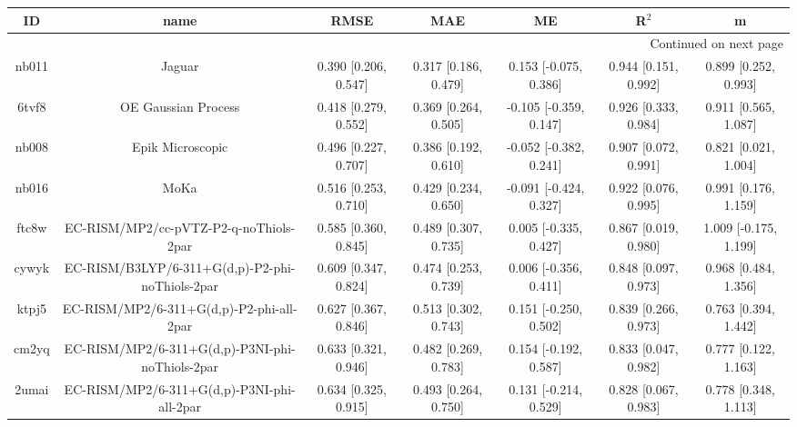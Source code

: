 \documentclass{article}
\begin{document}
\begin{center}
\begin{longtable}{|ccccccc|}
\toprule
    ID &                                               name &                  RMSE &                   MAE &                       ME &                 R$^2$ &                      m \\
\midrule
\endhead
\midrule
\multicolumn{7}{r}{{Continued on next page}} \\
\midrule
\endfoot

\bottomrule
\endlastfoot
 nb011 &                                             Jaguar &  0.390 [0.206, 0.547] &  0.317 [0.186, 0.479] &    0.153 [-0.075, 0.386] &  0.944 [0.151, 0.992] &   0.899 [0.252, 0.993] \\
 6tvf8 &                                OE Gaussian Process &  0.418 [0.279, 0.552] &  0.369 [0.264, 0.505] &   -0.105 [-0.359, 0.147] &  0.926 [0.333, 0.984] &   0.911 [0.565, 1.087] \\
 nb008 &                                   Epik Microscopic &  0.496 [0.227, 0.707] &  0.386 [0.192, 0.610] &   -0.052 [-0.382, 0.241] &  0.907 [0.072, 0.991] &   0.821 [0.021, 1.004] \\
 nb016 &                                               MoKa &  0.516 [0.253, 0.710] &  0.429 [0.234, 0.650] &   -0.091 [-0.424, 0.327] &  0.922 [0.076, 0.995] &   0.991 [0.176, 1.159] \\
 ftc8w &             EC-RISM/MP2/cc-pVTZ-P2-q-noThiols-2par &  0.585 [0.360, 0.845] &  0.489 [0.307, 0.735] &    0.005 [-0.335, 0.427] &  0.867 [0.019, 0.980] &  1.009 [-0.175, 1.199] \\
 cywyk &    EC-RISM/B3LYP/6-311+G(d,p)-P2-phi-noThiols-2par &  0.609 [0.347, 0.824] &  0.474 [0.253, 0.739] &    0.006 [-0.356, 0.411] &  0.848 [0.097, 0.973] &   0.968 [0.484, 1.356] \\
 ktpj5 &           EC-RISM/MP2/6-311+G(d,p)-P2-phi-all-2par &  0.627 [0.367, 0.846] &  0.513 [0.302, 0.743] &    0.151 [-0.250, 0.502] &  0.839 [0.266, 0.973] &   0.763 [0.394, 1.442] \\
 cm2yq &    EC-RISM/MP2/6-311+G(d,p)-P3NI-phi-noThiols-2par &  0.633 [0.321, 0.946] &  0.482 [0.269, 0.783] &    0.154 [-0.192, 0.587] &  0.833 [0.047, 0.982] &   0.777 [0.122, 1.163] \\
 2umai &         EC-RISM/MP2/6-311+G(d,p)-P3NI-phi-all-2par &  0.634 [0.325, 0.915] &  0.493 [0.264, 0.750] &    0.131 [-0.214, 0.529] &  0.828 [0.067, 0.983] &   0.778 [0.348, 1.113] \\

\end{longtable}
\end{center}
\end{document}
